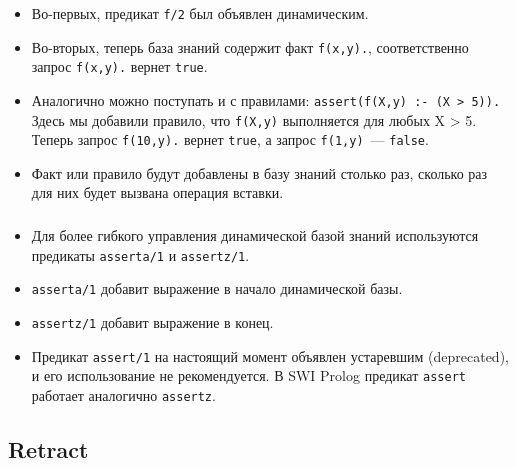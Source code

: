 \begin{frame}

	\frametitle{\insertsection}
	\framesubtitle{\insertsubsection}
	
	\begin{itemize}
		\item Во-первых, предикат \texttt{f/2} был объявлен динамическим.
		\item Во-вторых, теперь база знаний содержит факт \texttt{f(x,y).}, соответственно запрос \texttt{f(x,y).} вернет \texttt{true}.
		\item Аналогично можно поступать и с правилами: \texttt{assert(f(X,y) :- (X > 5)).} Здесь мы добавили правило, что \texttt{f(X,y)} выполняется для любых X > 5. Теперь запрос \texttt{f(10,y).} вернет \texttt{true}, а запрос \texttt{f(1,y)}~--- \texttt{false}.
		\item Факт или правило будут добавлены в базу знаний столько раз, сколько раз для них будет вызвана операция вставки.
	\end{itemize}

\end{frame}



\begin{frame}

	\frametitle{\insertsection}
	\framesubtitle{\insertsubsection}
	
	\begin{itemize}
		\item Для более гибкого управления динамической базой знаний используются предикаты \texttt{asserta/1} и \texttt{assertz/1}.
		\item \texttt{asserta/1} добавит выражение в начало динамической базы.
		\item \texttt{assertz/1} добавит выражение в конец.
		\item Предикат \texttt{assert/1} на настоящий момент объявлен устаревшим (deprecated), и его использование не рекомендуется. В SWI Prolog предикат \texttt{assert} работает аналогично \texttt{assertz}.
	\end{itemize}

\end{frame}



\subsection{Retract}


